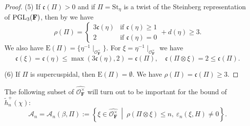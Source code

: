 \documentclass[A4]{amsart}
\def\leq{\leqslant}
\def\geq{\geqslant}
\numberwithin{equation}{section} \everymath{\displaystyle}
\newcommand{\PGL}{{\rm PGL}}
\newcommand{\F}{\mathbf{F}}
\newcommand{\vO}{\mathcal{O}}
\newcommand{\cond}{\mathfrak{c}}
\newcommand{\condL}{\mathfrak{\rho}}
\begin{document}
\begin{proof}
\noindent (5) If $\cond(\Pi) > 0$ and if $\Pi = \mathrm{St}_{\eta}$ is a twist of the Steinberg representation of $\PGL_3(\F)$, then by \cite[\S 8 Proposition \& \S 10 Proposition]{Ro94} we have
	$$ \condL(\Pi) = \begin{cases}
		3 \cond(\eta) & \text{if } \cond(\eta) \geq 1 \\
		2 & \text{if } \cond(\eta)=0
	\end{cases} + d(\eta) \geq 3. $$
	We also have $\mathrm{E}(\Pi) = \{ \eta^{-1} \mid_{\vO_{\F}^{\times}} \}$. For $\xi = \eta^{-1} \mid_{\vO_{\F}^{\times}}$ we have
	$$ \cond(\xi) = \cond(\eta) \leq \max(3\cond(\eta),2) = \cond(\Pi), \quad \cond(\Pi \otimes \xi) = 2 \leq \cond(\Pi). $$
	
\noindent (6) If $\Pi$ is supercuspidal, then $\mathrm{E}(\Pi) = \emptyset$. We have $\condL(\Pi) = \cond(\Pi) \geq 3$.
\end{proof}

\noindent The following subset of $\widehat{\vO_{\F}^{\times}}$ will turn out to be important for the bound of $\widetilde{h}_n^+(\chi)$:
\begin{equation}
	\mathcal{A}_n = \mathcal{A}_n(\beta, \Pi) := \left\{ \xi \in \widehat{\vO_{\F}^{\times}} \ \middle| \ \condL(\Pi \otimes \xi) \leq n, \ \varepsilon_n(\xi,H) \neq 0 \right\}.
\end{equation}
\end{document}
